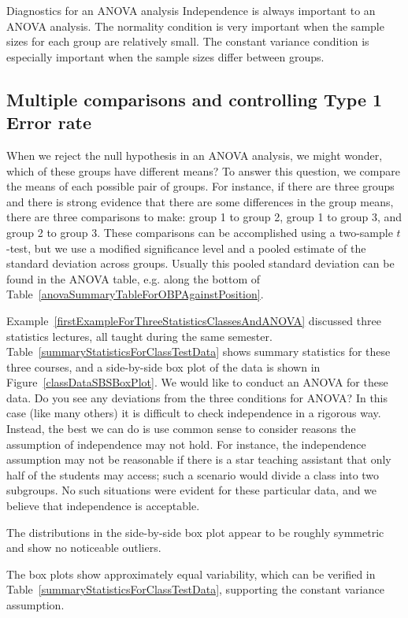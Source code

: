 \begin{caution}{Diagnostics for an ANOVA analysis}
{Independence is always important to an ANOVA analysis. The normality condition is very important when the sample sizes for each group are relatively small. The constant variance condition is especially important when the sample sizes differ between groups.}
\end{caution}


\subsection{Multiple comparisons and controlling Type 1 Error rate}
\label{multipleComparisonsAndControllingTheType1ErrorRate}


When we reject the null hypothesis in an ANOVA analysis, we might wonder, which of these groups have different means? To answer this question, we compare the means of each possible pair of groups. For instance, if there are three groups and there is strong evidence that there are some differences in the group means, there are three comparisons to make: group 1 to group 2, group 1 to group 3, and group 2 to group 3. These comparisons can be accomplished using a two-sample $t$-test, but we use a modified significance level and a pooled estimate of the standard deviation across groups. Usually this pooled standard deviation can be found in the ANOVA table, e.g. along the bottom of Table~\ref{anovaSummaryTableForOBPAgainstPosition}.

\textB{\newpage}

\begin{example}{Example~\vref{firstExampleForThreeStatisticsClassesAndANOVA} discussed three statistics lectures, all taught during the same semester. Table~\ref{summaryStatisticsForClassTestData} shows summary statistics for these three courses, and a side-by-side box plot of the data is shown in Figure~\ref{classDataSBSBoxPlot}. We would like to conduct an ANOVA for these data. Do you see any deviations from the three conditions for ANOVA?}
In this case (like many others) it is difficult to check independence in a rigorous way. Instead, the best we can do is use common sense to consider reasons the assumption of independence may not hold. For instance, the independence assumption may not be reasonable if there is a star teaching assistant that only half of the students may access; such a scenario would divide a class into two subgroups. No such situations were evident for these particular data, and we believe that independence is acceptable.

The distributions in the side-by-side box plot appear to be roughly symmetric and show no noticeable outliers.

The box plots show approximately equal variability, which can be verified in Table~\ref{summaryStatisticsForClassTestData}, supporting the constant variance assumption.
\end{example}

